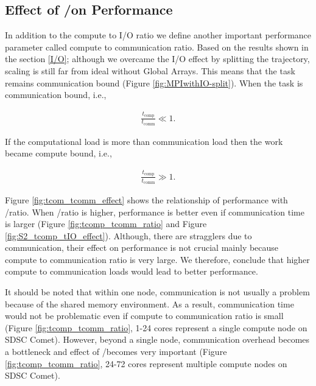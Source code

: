 \subsection{Effect of \tcomp/\tcomm on Performance}
In addition to the compute to I/O ratio we define another important performance parameter called compute to communication ratio.
Based on the results shown in the section \ref{I/O}; although we overcame the I/O effect by splitting the trajectory, scaling is still far from ideal without Global Arrays.
This means that the task remains communication bound (Figure \ref{fig:MPIwithIO-split}). 
When the task is communication bound, i.e.,

\begin{gather*}
  \frac{t_{\text{comp}}}{t_{\text{comm}}} \ll 1.
\end{gather*}

If the computational load is more than communication load then the work became compute bound, i.e.,

\begin{gather*}
  \frac{t_{\text{comp}}}{t_{\text{comm}}} \gg 1.
\end{gather*}

Figure \ref{fig:tcom_tcomm_effect} shows the relationship of performance with \tcomp/\tcomm ratio.
When \tcomp/\tcomm ratio is higher, performance is better even if communication time is larger (Figure \ref{fig:tcomp_tcomm_ratio} and Figure \ref{fig:S2_tcomp_tIO_effect}).
Although, there are stragglers due to communication, their effect on performance is not crucial mainly because compute to communication ratio is very large. 
We therefore, conclude that higher compute to communication loads would lead to better performance. 

It should be noted that within one node, communication is not usually a problem because of the shared memory environment. 
As a result, communication time would not be problematic even if compute to communication ratio is small (Figure \ref{fig:tcomp_tcomm_ratio}, 1-24 cores represent a single compute node on SDSC Comet).
However, beyond a single node, communication overhead becomes a bottleneck and effect of \tcomp/\tcomm becomes very important (Figure \ref{fig:tcomp_tcomm_ratio}, 24-72 cores represent multiple compute nodes on SDSC Comet).

